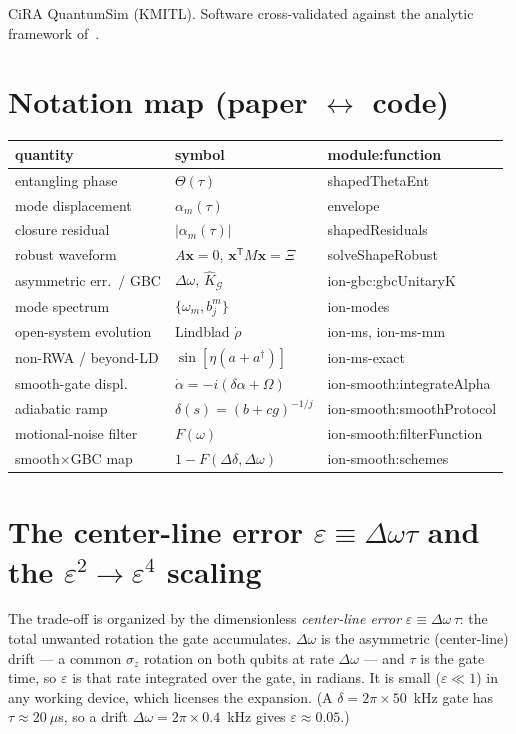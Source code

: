 \documentclass[aps,prapplied,twocolumn,superscriptaddress,floatfix,nofootinbib]{revtex4-2}
\begin{document}
\begin{acknowledgments}
CiRA QuantumSim (KMITL). Software cross-validated against the analytic framework
of~\cite{Zhang25}.
\end{acknowledgments}

\appendix

\section{Notation map (paper $\leftrightarrow$ code)}\label{app:notation}
{\scriptsize
\begin{ruledtabular}
\begin{tabular}{@{}p{}p{}p{}@{}}
quantity & symbol & module:function \\ \hline
entangling phase & $\Theta(\tau)$ & \textsf{shapedThetaEnt} \\
mode displacement & $\alpha_m(\tau)$ & \textsf{envelope} \\
closure residual & $|\alpha_m(\tau)|$ & \textsf{shapedResiduals} \\
robust waveform & $A\mathbf x{=}0$, $\mathbf x^{\mathsf T}\!M\mathbf x{=}\Xi$ & \textsf{solveShapeRobust} \\
asymmetric err.\ / GBC & $\Delta\omega$, $\hat K_{\mathcal G}$ & \textsf{ion-gbc:gbcUnitaryK} \\
mode spectrum & $\{\omega_m,b^m_j\}$ & \textsf{ion-modes} \\
open-system evolution & Lindblad $\dot\rho$ & \textsf{ion-ms}, \textsf{ion-ms-mm} \\
non-RWA / beyond-LD & $\sin[\eta(a{+}a^\dagger)]$ & \textsf{ion-ms-exact} \\
smooth-gate displ. & $\dot\alpha{=}{-}i(\delta\alpha{+}\Omega)$ & \textsf{ion-smooth:integrateAlpha} \\
adiabatic ramp & $\delta(s){=}(b{+}cg)^{-1/j}$ & \textsf{ion-smooth:smoothProtocol} \\
motional-noise filter & $F(\omega)$ & \textsf{ion-smooth:filterFunction} \\
smooth$\times$GBC map & $1{-}F(\Delta\delta,\Delta\omega)$ & \textsf{ion-smooth:schemes} \\
\end{tabular}
\end{ruledtabular}
}

\section{The center-line error $\varepsilon\equiv\Delta\omega\tau$ and the $\varepsilon^2\!\to\!\varepsilon^4$ scaling}\label{app:eps}
The trade-off is organized by the dimensionless \emph{center-line error}
$\varepsilon\equiv\Delta\omega\,\tau$: the total unwanted rotation the gate accumulates.
$\Delta\omega$ is the asymmetric (center-line) drift --- a common $\sigma_z$ rotation on both
qubits at rate $\Delta\omega$ --- and $\tau$ is the gate time, so $\varepsilon$ is that rate
integrated over the gate, in radians. It is small ($\varepsilon\ll1$) in any working device,
which licenses the expansion. (A $\delta=2\pi\times50$~kHz gate has $\tau\approx20~\mu$s, so a
drift $\Delta\omega=2\pi\times0.4$~kHz gives $\varepsilon\approx0.05$.)
\end{document}
